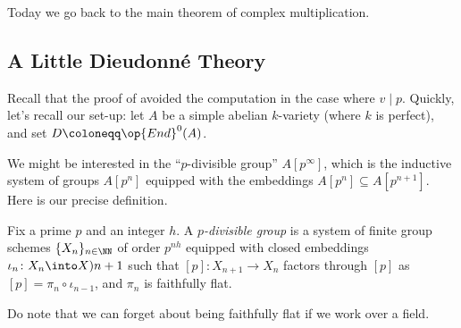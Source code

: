 \documentclass[../notes.tex]{subfiles}
\begin{document}
Today we go back to the main theorem of complex multiplication.

\subsection{A Little Dieudonn\'e Theory}
Recall that the proof of  avoided the computation in the case where $v\mid p$. Quickly, let's recall our set-up: let $A$ be a simple abelian $k$-variety (where $k$ is perfect), and set $D\coloneqq\op{End}^0(A)$.

We might be interested in the ``$p$-divisible group'' $A\left[p^\infty\right]$, which is the inductive system of groups $A\left[p^n\right]$ equipped with the embeddings $A\left[p^n\right]\subseteq A\left[p^{n+1}\right]$. Here is our precise definition.
\begin{defihelper} 
	Fix a prime $p$ and an integer $h$. A \textit{$p$-divisible group} is a system of finite group schemes $\{X_n\}_{n\in\NN}$ of order $p^{nh}$ equipped with closed embeddings $\iota_n\colon X_n\into X){n+1}$ such that $[p]\colon X_{n+1}\to X_n$ factors through $[p]$ as $[p]=\pi_n\circ\iota_{n-1}$, and $\pi_n$ is faithfully flat.
\end{defihelper}
Do note that we can forget about being faithfully flat if we work over a field.
\end{document}
